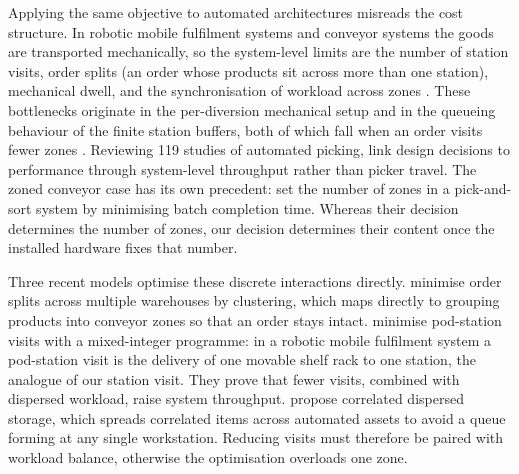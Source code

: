 \documentclass[]{interact}
\begin{document}
Applying the same objective to automated architectures misreads the cost structure. In robotic mobile fulfilment systems and conveyor systems the goods are transported mechanically, so the system-level limits are the number of station visits, order splits (an order whose products sit across more than one station), mechanical dwell, and the synchronisation of workload across zones \citep{azadeh2019, xie2021}. These bottlenecks originate in the per-diversion mechanical setup and in the queueing behaviour of the finite station buffers, both of which fall when an order visits fewer zones \citep{zhu2021, kim2020}. Reviewing 119 studies of automated picking, \citet{jaghbeer2020automated} link design decisions to performance through system-level throughput rather than picker travel. The zoned conveyor case has its own precedent: \citet{dekoster2012zones} set the number of zones in a pick-and-sort system by minimising batch completion time. Whereas their decision determines the number of zones, our decision determines their content once the installed hardware fixes that number.

Three recent models optimise these discrete interactions directly. \citet{zhu2021} minimise order splits across multiple warehouses by clustering, which maps directly to grouping products into conveyor zones so that an order stays intact. \citet{xie2021} minimise pod-station visits with a mixed-integer programme: in a robotic mobile fulfilment system a pod-station visit is the delivery of one movable shelf rack to one station, the analogue of our station visit. They prove that fewer visits, combined with dispersed workload, raise system throughput. \citet{mirzaei2021} propose correlated dispersed storage, which spreads correlated items across automated assets to avoid a queue forming at any single workstation. Reducing visits must therefore be paired with workload balance, otherwise the optimisation overloads one zone.
\end{document}
